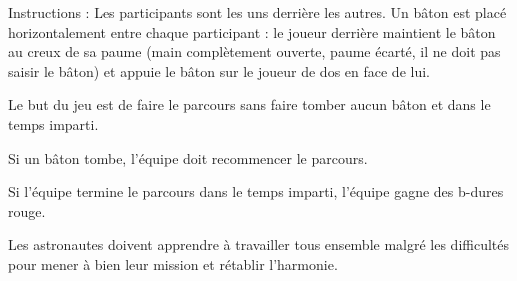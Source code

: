 \documentclass{grand-jeu}
\begin{document}
\begin{liste-materiel}
\end{liste-materiel}

\begin{regles}
Instructions : Les participants sont les uns derrière les autres. Un bâton est placé horizontalement entre chaque participant : le joueur derrière maintient le bâton au creux de sa paume (main complètement ouverte, paume écarté, il ne doit pas saisir le bâton) et appuie le bâton sur le joueur de dos en face de lui.

Le but du jeu est de faire le parcours sans faire tomber aucun bâton et dans le temps imparti.

Si un bâton tombe, l'équipe doit recommencer le parcours.

Si l'équipe termine le parcours dans le temps imparti, l'équipe gagne des b-dures rouge. 
\end{regles}

\begin{imaginaire}
Les astronautes doivent apprendre à travailler tous ensemble malgré les difficultés pour mener à bien leur mission et rétablir l'harmonie.
\end{imaginaire}

\begin{moments-stop}
\end{moments-stop}
\end{document}
